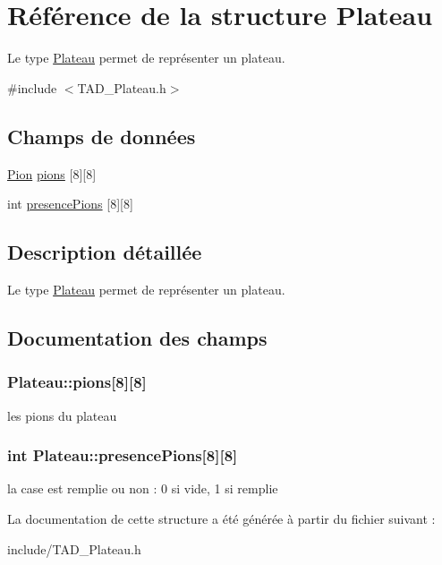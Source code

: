 \hypertarget{structPlateau}{\section{Référence de la structure Plateau}
\label{structPlateau}
}


Le type \hyperlink{structPlateau}{Plateau} permet de représenter un plateau.  




{\ttfamily \#include $<$T\-A\-D\-\_\-\-Plateau.\-h$>$}

\subsection*{Champs de données}
\begin{DoxyCompactItemize}
\item 
\hyperlink{structPion}{Pion} \hyperlink{structPlateau_a3a5262d16cd0c70d7beb0063c89e8eab}{pions} \mbox{[}8\mbox{]}\mbox{[}8\mbox{]}
\item 
int \hyperlink{structPlateau_a19cf42d21ac3b82250c46e32d3276bda}{presence\-Pions} \mbox{[}8\mbox{]}\mbox{[}8\mbox{]}
\end{DoxyCompactItemize}


\subsection{Description détaillée}
Le type \hyperlink{structPlateau}{Plateau} permet de représenter un plateau. 

\subsection{Documentation des champs}
\hypertarget{structPlateau_a3a5262d16cd0c70d7beb0063c89e8eab}{
\subsubsection[{pions}]{ Plateau\-::pions\mbox{[}8\mbox{]}\mbox{[}8\mbox{]}}}\label{structPlateau_a3a5262d16cd0c70d7beb0063c89e8eab}
les pions du plateau \hypertarget{structPlateau_a19cf42d21ac3b82250c46e32d3276bda}{
\subsubsection[{presence\-Pions}]{\setlength{\rightskip}{0pt plus 5cm}int Plateau\-::presence\-Pions\mbox{[}8\mbox{]}\mbox{[}8\mbox{]}}}\label{structPlateau_a19cf42d21ac3b82250c46e32d3276bda}
la case est remplie ou non \-: 0 si vide, 1 si remplie 

La documentation de cette structure a été générée à partir du fichier suivant \-:\begin{DoxyCompactItemize}
\item 
include/T\-A\-D\-\_\-\-Plateau.\-h\end{DoxyCompactItemize}
